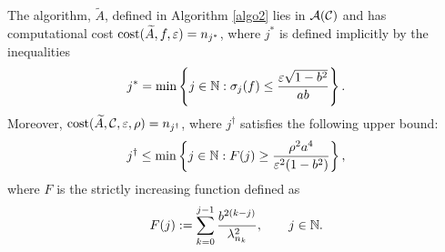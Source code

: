 \documentclass[graybox,footinfo]{svmult}
\begin{document}
\begin{theorem}\label{thm:compcost}
The algorithm, $\widetilde{A}$, defined in Algorithm \ref{algo2} lies in ${\mathcal{A}}({\mathcal{C}})$ and has computational cost $\textup{cost}(\widetilde{A},f,\varepsilon)=n_{j^*}$, where $j^*$ is defined implicitly by the inequalities 
\begin{equation} \label{eq:OurAlgjstar}
j^* = \min\left \{ j \in \bbN : \sigma_{j}(f) \le \frac{\varepsilon\sqrt{1 - b^2}}{ab}  \right\}.
\end{equation}
Moreover, $\textup{cost}(\widetilde{A},{\mathcal{C}},\varepsilon,\rho) = n_{j^\dagger}$, where $j^\dagger$ satisfies the following upper bound:
\begin{equation} \label{jdagger}
j^\dagger \le \min \left \{j \in \bbN : F(j) \ge \frac{\rho^2 a^4}{\varepsilon^2(1 - b^2)} \right\},
\end{equation}
where $F$ is the strictly increasing function defined as
\begin{equation} \label{jsum}
F(j): = \sum_{k=0}^{j-1} \frac{b^{2(k-j)}}{\lambda_{n_{k}}^2}, \qquad j \in \N.
\end{equation}
\end{theorem}
\end{document}
